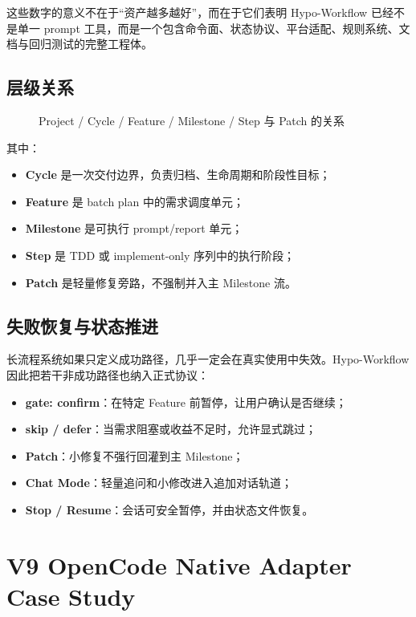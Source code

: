 \documentclass[
  outputdir=build,
  chapterstyle=cn,
  colorscheme=Simple,
  fontset=tech,
  code=false
]{Hypo-Note}
\begin{document}
这些数字的意义不在于“资产越多越好”，而在于它们表明 Hypo-Workflow 已经不是单一 prompt 工具，而是一个包含命令面、状态协议、平台适配、规则系统、文档与回归测试的完整工程体。

\section{层级关系}

\begin{figure}[H]
  \centering
  
  \caption{Project / Cycle / Feature / Milestone / Step 与 Patch 的关系}
\end{figure}

其中：

\begin{itemize}[leftmargin=2em]
  \item \textbf{Cycle} 是一次交付边界，负责归档、生命周期和阶段性目标；
  \item \textbf{Feature} 是 batch plan 中的需求调度单元；
  \item \textbf{Milestone} 是可执行 prompt/report 单元；
  \item \textbf{Step} 是 TDD 或 implement-only 序列中的执行阶段；
  \item \textbf{Patch} 是轻量修复旁路，不强制并入主 Milestone 流。
\end{itemize}

\section{失败恢复与状态推进}

长流程系统如果只定义成功路径，几乎一定会在真实使用中失效。Hypo-Workflow 因此把若干非成功路径也纳入正式协议：

\begin{itemize}[leftmargin=2em]
  \item \textbf{gate: confirm}：在特定 Feature 前暂停，让用户确认是否继续；
  \item \textbf{skip / defer}：当需求阻塞或收益不足时，允许显式跳过；
  \item \textbf{Patch}：小修复不强行回灌到主 Milestone；
  \item \textbf{Chat Mode}：轻量追问和小修改进入追加对话轨道；
  \item \textbf{Stop / Resume}：会话可安全暂停，并由状态文件恢复。
\end{itemize}

\chapter{V9 OpenCode Native Adapter Case Study}
\end{document}
